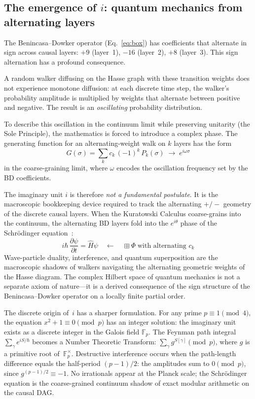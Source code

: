 \documentclass[aps,prd,twocolumn,superscriptaddress,nofootinbib,amsmath,amssymb,longbibliography]{revtex4-2}
\begin{document}
\subsection{The emergence of $i$: quantum mechanics from alternating layers}

The Benincasa--Dowker operator (Eq.~\ref{eq:box}) has coefficients that
alternate in sign across causal layers: $+9$ (layer~1), $-16$ (layer~2),
$+8$ (layer~3).  This sign alternation has a profound consequence.

A random walker diffusing on the Hasse graph with these transition weights
does not experience monotone diffusion: at each discrete time step, the
walker's probability amplitude is multiplied by weights that alternate
between positive and negative.  The result is an \emph{oscillating}
probability distribution.

To describe this oscillation in the continuum limit while preserving
unitarity (the Sole Principle), the mathematics is forced to introduce
a complex phase.  The generating function for an alternating-weight walk
on $k$ layers has the form
\begin{equation}
  G(\sigma) = \sum_{k} c_k\,(-1)^k\,P_k(\sigma)
  \;\longrightarrow\;
  e^{i\omega\sigma}
\end{equation}
in the coarse-graining limit, where $\omega$ encodes the oscillation
frequency set by the BD coefficients.

The imaginary unit $i$ is therefore \emph{not a fundamental postulate}.
It is the macroscopic bookkeeping device required to track the
alternating $+/-$ geometry of the discrete causal layers.
When the Kuratowski Calculus coarse-grains into the continuum,
the alternating BD layers fold into the $e^{i\theta}$ phase of the
Schr\"{o}dinger equation~\cite{sorkin1994}:
\begin{equation}
  i\hbar\,\frac{\partial\psi}{\partial t} = \hat{H}\psi
  \quad\longleftarrow\quad
  \boxplus\Phi \;\text{with alternating } c_k
\end{equation}
Wave-particle duality, interference, and quantum superposition are the
macroscopic shadows of walkers navigating the alternating geometric
weights of the Hasse diagram.
The complex Hilbert space of quantum mechanics is not a separate axiom
of nature---it is a derived consequence of the sign structure of the
Benincasa--Dowker operator on a locally finite partial order.

The discrete origin of~$i$ has a sharper formulation.
For any prime $p \equiv 1 \pmod{4}$, the equation
$x^2 + 1 \equiv 0 \pmod{p}$ has an integer solution: the imaginary
unit exists as a discrete integer in the Galois field
$\mathbb{F}_p$.
The Feynman path integral
$\sum_\gamma e^{iS/\hbar}$ becomes a Number Theoretic Transform:
$\sum_\gamma g^{S[\gamma]} \pmod{p}$, where $g$ is a primitive root
of~$\mathbb{F}_p^\times$.
Destructive interference occurs when the path-length difference equals
the half-period $(p-1)/2$: the amplitudes sum to
$0 \pmod{p}$, since $g^{(p-1)/2} \equiv -1$.
No irrationals appear at the Planck scale; the Schr\"{o}dinger equation
is the coarse-grained continuum shadow of exact modular arithmetic on
the causal DAG.
\end{document}
